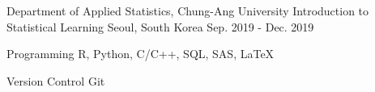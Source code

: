 \documentclass[11pt, a4paper]{awesome-cv} %
\begin{document}
\begin{cventries}
	\cventry
	{Department of Applied Statistics, Chung-Ang University} %
	{Introduction to Statistical Learning} %
	{Seoul, South Korea} %
	{Sep. 2019 - Dec. 2019} %
	{} %
\end{cventries}


\begin{cvskills}
	\cvskill
	{Programming} %
	{R, Python, C/C++, SQL, SAS, LaTeX} %
	
	\cvskill
	{Version Control} %
	{Git} %
	
%	
%	
%	
\end{cvskills}

\end{document}
